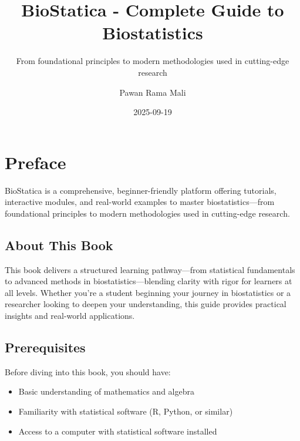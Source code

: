\documentclass[
  11pt,
  letterpaper,
  oneside]{book}
\title{BioStatica - Complete Guide to Biostatistics}
\subtitle{From foundational principles to modern methodologies used in
cutting-edge research}
\author{Pawan Rama Mali}
\date{2025-09-19}
\providecommand{\tightlist}{%
  \setlength{\itemsep}{0pt}\setlength{\parskip}{0pt}}\usepackage{longtable,booktabs,array}
\renewcommand*\contentsname{Table of contents}
\newcommand\contentsname{Table of contents}
\begin{document}
\frontmatter
\maketitle

\renewcommand*\contentsname{Table of contents}
{
\hypersetup{linkcolor=}
\setcounter{tocdepth}{2}
\tableofcontents
}

\mainmatter
{}

\chapter*{Preface}\label{preface}


BioStatica is a comprehensive, beginner-friendly platform offering
tutorials, interactive modules, and real-world examples to master
biostatistics---from foundational principles to modern methodologies
used in cutting-edge research.

\section*{About This Book}\label{about-this-book}


This book delivers a structured learning pathway---from statistical
fundamentals to advanced methods in biostatistics---blending clarity
with rigor for learners at all levels. Whether you're a student
beginning your journey in biostatistics or a researcher looking to
deepen your understanding, this guide provides practical insights and
real-world applications.

\section*{Prerequisites}\label{prerequisites}


Before diving into this book, you should have:

\begin{itemize}
\tightlist
\item
  Basic understanding of mathematics and algebra
\item
  Familiarity with statistical software (R, Python, or similar)
\item
  Access to a computer with statistical software installed
\end{itemize}
\end{document}
